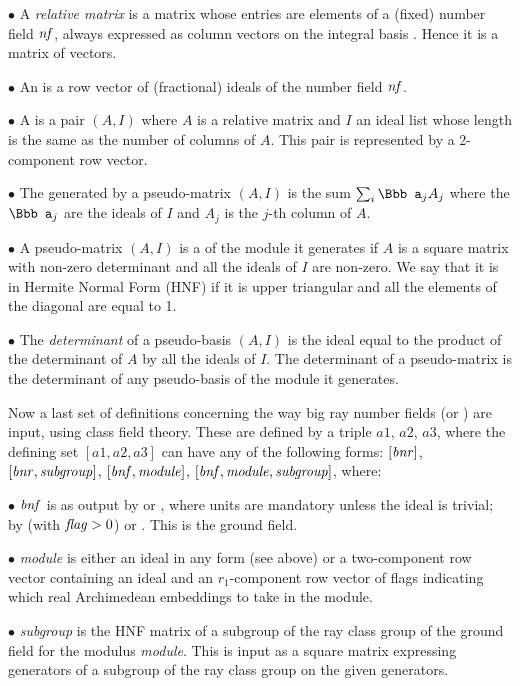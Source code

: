 $\bullet$ A \emph{relative matrix} is a matrix whose entries are
elements of a (fixed) number field $\hbox{\it nf\/}$, always expressed as column
vectors on the integral basis . Hence it is a matrix of
vectors.

$\bullet$ An  is a row vector of (fractional)
ideals of the number field $\hbox{\it nf\/}$.

$\bullet$ A  is a pair $(A,I)$ where $A$ is a
relative matrix and $I$ an ideal list whose length is the same as the number
of columns of $A$. This pair is represented by a 2-component row vector.

$\bullet$ The  generated by a pseudo-matrix $(A,I)$ is
the sum $\sum_i {\Bbb a}_j A_j$ where the ${\Bbb a}_j$ are the ideals of $I$
and $A_j$ is the $j$-th column of $A$.

$\bullet$ A pseudo-matrix $(A,I)$ is a  of the module
it generates if $A$ is a square matrix with non-zero determinant and all the
ideals of $I$ are non-zero. We say that it is in Hermite Normal
Form (HNF) if it is upper triangular and all the
elements of the diagonal are equal to 1.

$\bullet$ The \emph{determinant} of a pseudo-basis $(A,I)$ is the ideal
equal to the product of the determinant of $A$ by all the ideals of $I$. The
determinant of a pseudo-matrix is the determinant of any pseudo-basis of the
module it generates.

Now a last set of definitions concerning the way big ray number fields
(or ) are input, using class field theory.
These are defined by a triple
$a1$, $a2$, $a3$, where the defining set $[a1,a2,a3]$ can have any of the
following forms: $[\hbox{\it bnr\/}]$, $[\hbox{\it bnr\/},\hbox{\it subgroup\/}]$,
$[\hbox{\it bnf\/},\hbox{\it module\/}]$, $[\hbox{\it bnf\/},\hbox{\it module\/},\hbox{\it subgroup\/}]$, where:

$\bullet$ $\hbox{\it bnf\/}$ is as output by  or ,
where units are mandatory unless the ideal is trivial;  by
 (with $\hbox{\it f\kern0pt lag\/}>0$) or . This is the ground field.

$\bullet$ \emph{module} is either an ideal in any form (see above) or a
two-component row vector containing an ideal and an $r_1$-component row
vector of flags indicating which real Archimedean embeddings to take in the
module.

$\bullet$ \emph{subgroup} is the HNF matrix of a subgroup of the ray class group
of the ground field for the modulus \emph{module}. This is input as a square
matrix expressing generators of a subgroup of the ray class group
 on the given generators.


